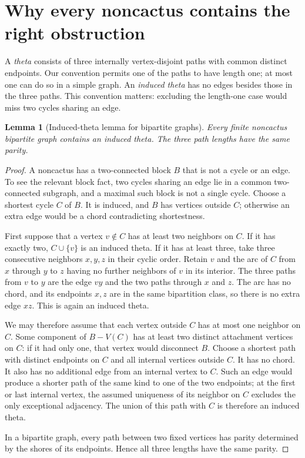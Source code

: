 \documentclass[11pt]{article}
\numberwithin{equation}{section}
\newtheorem{lemma}[theorem]{Lemma}
\theoremstyle{definition}
\begin{document}
\section{Why every noncactus contains the right obstruction}
\label{cac:sec:theta}

A \emph{theta} consists of three internally vertex-disjoint paths with common distinct endpoints. Our convention permits one of the paths to have length one; at most one can do so in a simple graph. An \emph{induced theta} has no edges besides those in the three paths. This convention matters: excluding the length-one case would miss two cycles sharing an edge.

\begin{lemma}[Induced-theta lemma for bipartite graphs]
\label{cac:lem:theta}
Every finite noncactus bipartite graph contains an induced theta. The three path lengths have the same parity.
\end{lemma}
\begin{proof}
A noncactus has a two-connected block $B$ that is not a cycle or an edge. To see the relevant block fact, two cycles sharing an edge lie in a common two-connected subgraph, and a maximal such block is not a single cycle. Choose a shortest cycle $C$ of $B$. It is induced, and $B$ has vertices outside $C$; otherwise an extra edge would be a chord contradicting shortestness.

First suppose that a vertex $v\notin C$ has at least two neighbors on $C$. If it has exactly two, $C\cup\{v\}$ is an induced theta. If it has at least three, take three consecutive neighbors $x,y,z$ in their cyclic order. Retain $v$ and the arc of $C$ from $x$ through $y$ to $z$ having no further neighbors of $v$ in its interior. The three paths from $v$ to $y$ are the edge $vy$ and the two paths through $x$ and $z$. The arc has no chord, and its endpoints $x,z$ are in the same bipartition class, so there is no extra edge $xz$. This is again an induced theta.

We may therefore assume that each vertex outside $C$ has at most one neighbor on $C$. Some component of $B-V(C)$ has at least two distinct attachment vertices on $C$: if it had only one, that vertex would disconnect $B$. Choose a shortest path with distinct endpoints on $C$ and all internal vertices outside $C$. It has no chord. It also has no additional edge from an internal vertex to $C$. Such an edge would produce a shorter path of the same kind to one of the two endpoints; at the first or last internal vertex, the assumed uniqueness of its neighbor on $C$ excludes the only exceptional adjacency. The union of this path with $C$ is therefore an induced theta.

In a bipartite graph, every path between two fixed vertices has parity determined by the shores of its endpoints. Hence all three lengths have the same parity.
\end{proof}
\end{document}
